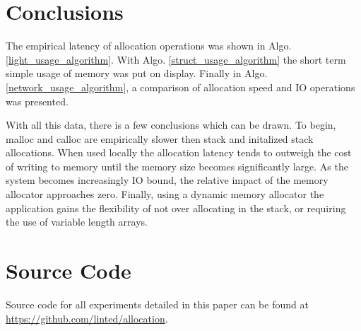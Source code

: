 \documentclass[letterpaper, 10 pt, conference]{ieeeconf}  %
\newcommand*\GitHubLoc{https://github.com/linted/allocation}
\begin{document}


\section{Conclusions}
The empirical latency of allocation operations was shown in Algo. \ref{light_usage_algorithm}.
With Algo. \ref{struct_usage_algorithm} the short term simple usage of memory was put on display.
Finally in Algo. \ref{network_usage_algorithm}, a comparison of allocation speed and IO operations was presented.

With all this data, there is a few conclusions which can be drawn.
To begin, malloc and calloc are empirically slower then stack and initalized stack allocations.
When used locally the allocation latency tends to outweigh the cost of writing to memory until the memory size becomes significantly large.
As the system becomes increasingly IO bound, the relative impact of the memory allocator approaches zero.
Finally, using a dynamic memory allocator the application gains the flexibility of not over allocating in the stack, or requiring the use of variable length arrays.

\section{Source Code}

Source code for all experiments detailed in this paper can be found at \url{\GitHubLoc}.





\clearpage
\end{document}
